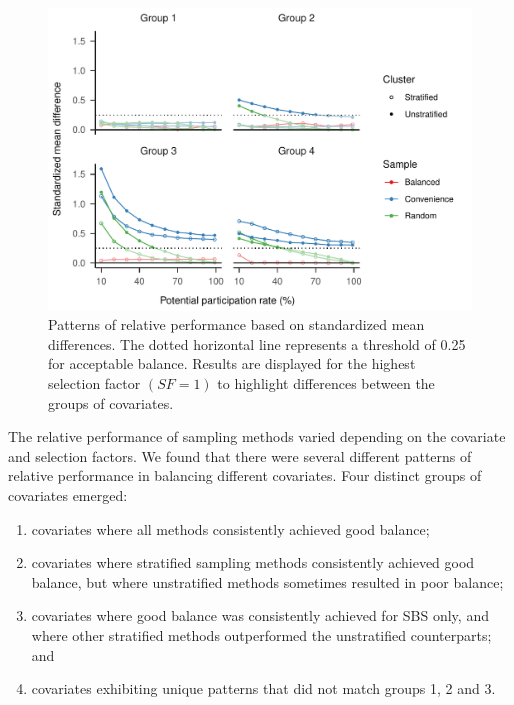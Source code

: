 \documentclass[
  man,floatsintext]{apa6}
\providecommand{\tightlist}{%
  \setlength{\itemsep}{0pt}\setlength{\parskip}{0pt}}
\begin{document}
\begin{figure}
\centering
\includegraphics{6---Paper_files/figure-latex/fig-SMD-groups-1.pdf}
\caption{\label{fig:fig-SMD-groups}Patterns of relative performance based on standardized mean differences. The dotted horizontal line represents a threshold of 0.25 for acceptable balance. Results are displayed for the highest selection factor \((SF = 1)\) to highlight differences between the groups of covariates.}
\end{figure}

The relative performance of sampling methods varied depending on the covariate and selection factors. We found that there were several different patterns of relative performance in balancing different covariates. Four distinct groups of covariates emerged:

\begin{enumerate}
\def\labelenumi{(\arabic{enumi})}
\tightlist
\item
  covariates where all methods consistently achieved good balance;
\item
  covariates where stratified sampling methods consistently achieved good balance, but where unstratified methods sometimes resulted in poor balance;
\item
  covariates where good balance was consistently achieved for SBS only, and where other stratified methods outperformed the unstratified counterparts; and\\
\item
  covariates exhibiting unique patterns that did not match groups 1, 2 and 3.
\end{enumerate}
\end{document}
